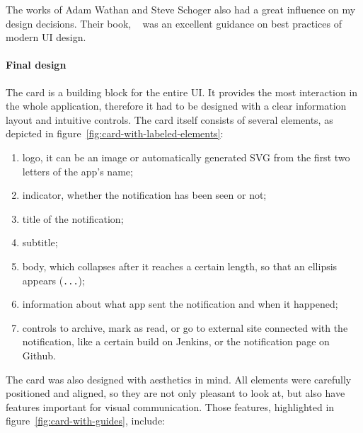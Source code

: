 The works of Adam Wathan and Steve Schoger
also had a great influence
on my design decisions.
Their book,
~\cite{wathan_refactoring_2018}
was an excellent guidance on best practices
of modern \ac{UI} design.

\paragraph*{Final design}\label{sec:final-design}

The card is a building block for the entire \ac{UI}.
It provides the most interaction in the whole application,
therefore it had to be designed with a clear information layout
and intuitive controls.
The card itself consists of several elements,
as depicted in figure~\ref{fig:card-with-labeled-elements}:

\begin{enumerate}
      \item
            logo,
            it can be an image
            or automatically generated \ac{SVG}
            from the first two letters of the app's name;
      \item
            indicator,
            whether the notification has been seen or not;
      \item
            title of the notification;
      \item
            subtitle;
      \item
            body,
            which collapses after it reaches a certain length,
            so that an ellipsis appears (\texttt{...});
      \item
            information about what app sent the notification and when it happened;
      \item
            controls to archive,
            mark as read,
            or go to external site connected with the notification,
            like a certain build on Jenkins,
            or the notification page on Github.
\end{enumerate}

The card was also designed with aesthetics in mind.
All elements were carefully positioned and aligned,
so they are not only pleasant to look at,
but also have features important for visual communication.
Those features, highlighted in figure~\ref{fig:card-with-guides}, include:

